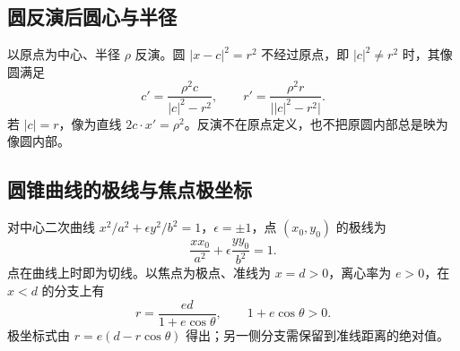 \documentclass[../main.tex]{subfiles}
\begin{document}
\subsection{圆反演后圆心与半径}
以原点为中心、半径 $\rho$ 反演。圆 $|x-c|^2=r^2$ 不经过原点，即 $|c|^2\ne r^2$ 时，其像圆满足
\[
c'=\frac{\rho^2c}{|c|^2-r^2},\qquad
r'=\frac{\rho^2r}{\bigl||c|^2-r^2\bigr|}.
\]
若 $|c|=r$，像为直线 $2c\cdot x'=\rho^2$。反演不在原点定义，也不把原圆内部总是映为像圆内部。
\subsection{圆锥曲线的极线与焦点极坐标}
对中心二次曲线 $x^2/a^2+\epsilon y^2/b^2=1$，$\epsilon=\pm1$，点 $(x_0,y_0)$ 的极线为
\[
\frac{xx_0}{a^2}+\epsilon\frac{yy_0}{b^2}=1.
\]
点在曲线上时即为切线。以焦点为极点、准线为 $x=d>0$，离心率为 $e>0$，在 $x<d$ 的分支上有
\[
r=\frac{ed}{1+e\cos\theta},\qquad 1+e\cos\theta>0.
\]
极坐标式由 $r=e(d-r\cos\theta)$ 得出；另一侧分支需保留到准线距离的绝对值。
\clearpage
\end{document}
